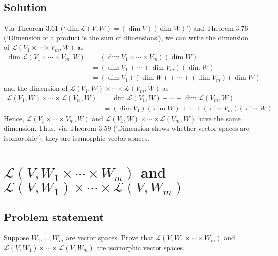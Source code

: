 \documentclass{article}
\begin{document}
\subsection*{Solution}
Via Theorem 3.61 (`$\operatorname{dim}\mathcal{L}(V,W)=(\operatorname{dim}V)(\operatorname{dim}W)$') and Theorem 3.76 (`Dimension of a product is the sum of dimensions'), we can write the dimension of $\mathcal{L}(V_1\times\cdots\times V_m,W)$ as
\begin{align*}
    \operatorname{dim}\mathcal{L}(V_1\times\cdots\times V_m,W)&=(\operatorname{dim}V_1\times\cdots\times V_m)(\operatorname{dim}W)\\
    &=(\operatorname{dim}V_1+\cdots+\operatorname{dim}V_m)(\operatorname{dim}W)\\
    &=(\operatorname{dim}V_1)(\operatorname{dim}W)+\cdots+(\operatorname{dim}V_m)(\operatorname{dim}W)
\end{align*}
and the dimension of $\mathcal{L}(V_1,W)\times\cdots\times\mathcal{L}(V_m,W)$ as
\begin{align*}
    \mathcal{L}(V_1,W)\times\cdots\times\mathcal{L}(V_m,W)&=\operatorname{dim}\mathcal{L}(V_1,W)+\cdots+\operatorname{dim}\mathcal{L}(V_m,W)\\
    &=(\operatorname{dim}V_1)(\operatorname{dim}W)+\cdots+(\operatorname{dim}V_m)(\operatorname{dim}W).
\end{align*}
Hence, $\mathcal{L}(V_1\times\cdots\times V_m,W)$ and $\mathcal{L}(V_1,W)\times\cdots\times\mathcal{L}(V_m,W)$ have the same dimension. 
Thus, via Theorem 3.59 (`Dimension shows whether vector spaces are isomorphic'), they are isomorphic vector spaces. 

\clearpage

\section{$\mathcal{L}(V,W_1\times\cdots\times W_m)$ and $\mathcal{L}(V,W_1)\times\cdots\times\mathcal{L}(V,W_m)$}
\subsection*{Problem statement}
Suppose $W_1,\ldots,W_m$ are vector spaces. 
Prove that $\mathcal{L}(V,W_1\times\cdots\times W_m)$ and $\mathcal{L}(V,W_1)\times\cdots\times\mathcal{L}(V,W_m)$ are isomorphic vector spaces.
\end{document}
